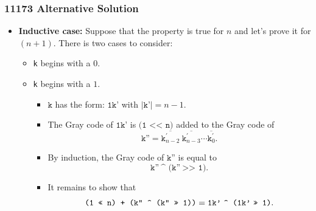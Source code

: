 \documentclass{beamer}
\begin{document}
\begin{frame}[fragile]
\frametitle{11173 Alternative Solution}

\footnotesize

\begin{itemize}

\item \textbf{Inductive case:} Suppose that the property is true for $n$ and let's prove it for $(n + 1)$. There is two cases to consider:
\begin{itemize}
\footnotesize
\item \texttt{k} begins with a $0$.

\vspace{0.15cm}

\item \texttt{k} begins with a $1$.
\begin{itemize}
\footnotesize
\vspace{0.15cm}

\item<1-> $\texttt{k}$ has the form: $\texttt{1k'}$ with $|\texttt{k'}| = n - 1$.

\vspace{0.15cm}

\item<3-> The Gray code of $\texttt{1k'}$ is $\texttt{(1 << n)}$ added to the Gray code of
$$
\texttt{k''} = \overline{\texttt{k}^{'}_{n-2}}\ \overline{\texttt{k}^{'}_{n-3}} \cdots \overline{\texttt{k}^{'}_{0}}.
$$

\vspace{0.15cm}

\item<4-> By induction, the Gray code of $\texttt{k''}$ is equal to
$$
\texttt{k''}\ \texttt{\textasciicircum\ (}\texttt{k''}\ \texttt{>> 1)}.
$$

\vspace{0.15cm}

\item<5-> It remains to show that
$$
\texttt{(1 << n) + \texttt{(k''}\ \texttt{\textasciicircum\ (}\texttt{k''}\ \texttt{>> 1))}} = \texttt{1k'}\ \texttt{\textasciicircum\ (}\texttt{1k'}\ \texttt{>> 1)}.
$$



\end{itemize}

\end{itemize}

\end{itemize}

\end{frame}
\end{document}
